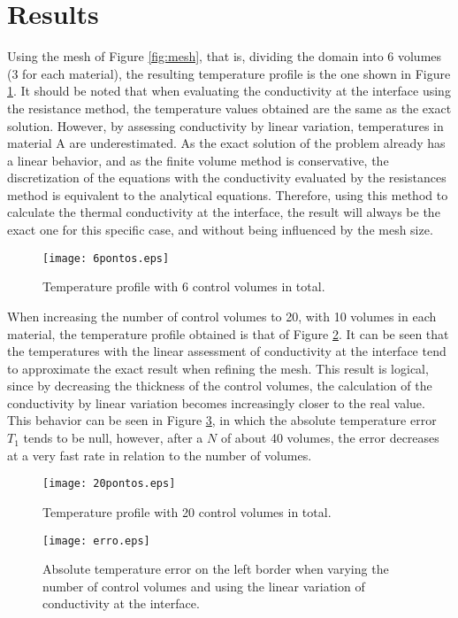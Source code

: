 \section{Results}

Using the mesh of Figure \ref{fig:mesh}, that is, dividing the domain into 6 volumes (3 for each material), the resulting temperature profile is the one shown in Figure \ref{fig:6points}.
It should be noted that when evaluating the conductivity at the interface using the resistance method, the temperature values obtained are the same as the exact solution.
However, by assessing conductivity by linear variation, temperatures in material A are underestimated.
As the exact solution of the problem already has a linear behavior, and as the finite volume method is conservative, the discretization of the equations with the conductivity evaluated by the resistances method is equivalent to the analytical equations.
Therefore, using this method to calculate the thermal conductivity at the interface, the result will always be the exact one for this specific case, and without being influenced by the mesh size.

\begin{figure}[H]
    \centering
    \texttt{[image: 6pontos.eps]}
    \caption{Temperature profile with 6 control volumes in total.}
    \label{fig:6points}
\end{figure}

When increasing the number of control volumes to 20, with 10 volumes in each material, the temperature profile obtained is that of Figure \ref{fig:20points}.
It can be seen that the temperatures with the linear assessment of conductivity at the interface tend to approximate the exact result when refining the mesh.
This result is logical, since by decreasing the thickness of the control volumes, the calculation of the conductivity by linear variation becomes increasingly closer to the real value.
This behavior can be seen in Figure \ref{fig:error}, in which the absolute temperature error $T_1$ tends to be null, however, after a $N$ of about 40 volumes, the error decreases at a very fast rate in relation to the number of volumes.

\begin{figure}[H]
    \centering
    \texttt{[image: 20pontos.eps]}
    \caption{Temperature profile with 20 control volumes in total.}
    \label{fig:20points}
\end{figure}

\begin{figure}[H]
    \centering
    \texttt{[image: erro.eps]}
    \caption{Absolute temperature error on the left border when varying the number of control volumes and using the linear variation of conductivity at the interface.}
    \label{fig:error}
\end{figure}